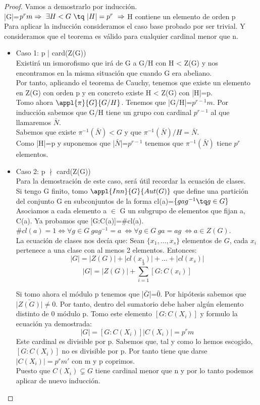 \documentclass[nochap]{apuntes}
\begin{document}
\begin{proof}
 Vamos a demostrarlo por inducción.\\
 |G|=$p^{r}m \Rightarrow \ \exists H < G \ \tq \ |H|=p^{r} \ \Rightarrow$  H contiene un elemento de orden p\\
 
 Para aplicar la inducción consideramos el caso base probado por ser trivial. Y consideramos que el teorema es válido para cualquier cardinal
 menor que n.
 \begin{itemize}
  \item Caso 1: p | card(Z(G))\\
    Existirá un ismorofismo que irá de G a G/H con H < Z(G) y nos encontramos en la misma situación que cuando G era abeliano.\\
    Por tanto, aplicando el teorema de Cauchy, tenemos que existe un elemento en Z(G) con orden p y en concreto existe H < Z(G) con |H|=p.\\
    Tomo ahora $\appl{\pi}{G}{G/H}$. Tenemos que |G/H|=$p^{r-1}m$. Por inducción sabemos que G/H tiene un grupo con cardinal $p^{r-1}$  al que
    llamaremos $\bar{N}$.\\
    Sabemos que existe $\pi^{-1}(\bar{N}) < G$  y que $\pi^{-1}(\bar{N}) /H=\bar{N}$.\\
    Como |H|=p y suponemos que |$\bar{N}$|=$p^{r-1}$  tenemos que $\pi^{-1}(\bar{N})$  tiene $p^{r}$  elementos.
    
  \item Caso 2: p $\nmid$  card(Z(G))\\
  Para la demostración de este caso, será útil recordar la ecuación de clases.\\
  Si tengo G finito, tomo $\appl{Inn}{G}{Aut(G)}$  que define una partición del conjunto G en subconjuntos de la forma cl(a)=$\{gag^{-1} \tq g\in G\}$
  Asociamos a cada elemento a $\in$ G un subgrupo de elementos que fijan a, C(a). Ya probamos que [G:C(a)]=$\#$cl(a).\\
  $\#cl(a)=1 \Leftrightarrow \forall g\in G \ gag^{-1}=a \ \Leftrightarrow \forall g \in G \ ga=ag \ \Leftrightarrow a \in Z(G)$.\\
  La ecuación de clases nos decía que:
  Sean $\{ x_1, \hdots, x_s \}$ elementos de $G$, cada $x_i$ pertenece a una clase con al menos 2 elementos. Entonces: \\
  $$|G| = |Z(G)| + |cl(x_1)| + \hdots + |cl(x_s)|$$
  $$|G| = |Z(G)| + \sum_{i=1}^{s}[G:C(x_i)]$$
  
  Si tomo ahora el módulo p tenemos que |$\bar{G}$|=$\bar{0}$. Por hipótesis sabemos que $\bar{|Z(G)|} \neq 0$. Por tanto, dentro del 
  sumatorio debe haber algún elemento distinto de 0 módulo p. Tomo este elemento $[G:C(X_i)]$  y formulo la ecuación ya
  demostrada:\\
  \[|G|=[G:C(X_i)]|C(X_i)|=p^{r}m\] Este cardinal es divisible por p. 
  Sabemos que, tal y como lo hemos escogido, $[G:C(X_i)]$  no es divisible por p. Por tanto tiene que darse $|C(X_i)|=p^{r}m'$  con m y p coprimos.\\
  Puesto que $C(X_i) \varsubsetneq G$  tiene cardinal menor que n y por lo tanto podemos aplicar de nuevo inducción.
 \end{itemize}


\end{proof}
\end{document}
